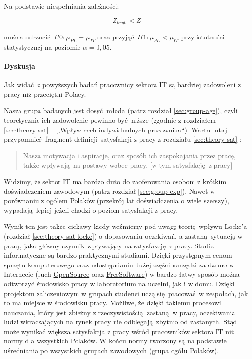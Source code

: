 Na podstawie niespełniania zależności:

\begin{equation}
  Z_{kryt.} < Z
\end{equation}

można odrzucić $H0: \mu_{PL} = \mu_{IT}$ oraz przyjąć $H1: \mu_{PL} < \mu_{IT}$ przy istotności statystycznej na poziomie $\alpha = 0,05$.

\paragraph{Dyskusja}
Jak widać z powyższych badań pracownicy sektora IT są bardziej zadowoleni z pracy niż przeciętni Polacy. 

Nasza grupa badanych jest dosyć młoda (patrz rozdział \ref{sec:group-age}), czyli teoretycznie ich zadowolenie powinno być niższe (zgodnie z rozdziałem \ref{sec:theory-sat} -- ,,Wpływ cech indywidualnych pracownika``). Warto tutaj przypomnieć fragment definicji satysfakcji z pracy z rozdziału \ref{sec:theory-sat} \cite{SchultzSat}:
\begin{quote}
  Nasza motywacja i aspiracje, oraz sposób ich zaspokajania przez pracę, także wpływają na postawy wobec pracy. [w tym satysfakcję z pracy]
\end{quote}
Widzimy, że sektor IT ma bardzo dużo do zaoferowania osobom z krótkim doświadczeniem zawodowym (patrz rozdział \ref{sec:group-exp}). Nawet w porównaniu z ogółem Polaków (przekrój lat doświadczenia o wiele szerszy), wypadają lepiej jeżeli chodzi o poziom satysfakcji z pracy.

Wynik ten jest także ciekawy kiedy weźmiemy pod uwagę teorię wpływu Locke'a (rozdział \ref{sec:theory-sat-locke}) o dopasowaniu oczekiwań, a zastaną sytuacją w pracy, jako główny czynnik wpływający na satysfakcję z pracy. Studia informatyczne są bardzo praktycznymi studiami. Dzięki przystępnym cenom sprzętu komputerowego oraz udostępnianiu dużej części narzędzi za darmo w Internecie (ruch
\href{http://en.wikipedia.org/wiki/Open-source_software}{OpenSource} oraz \href{http://en.wikipedia.org/wiki/Free_software}{FreeSoftware}) w bardzo łatwy sposób można odtworzyć środowisko pracy w laboratorium na uczelni, jak i w domu. Dzięki projektom zaliczeniowym w grupach studenci uczą się pracować w zespołach, jak to ma miejsce w środowisku pracy. Możliwe, że dzięki takiemu procesowi nauczania, który jest zbieżny z rzeczywistością zastaną w pracy, oczekiwania ludzi
wkraczających na rynek pracy nie odbiegają zbytnio od zastanych. Stąd może wynikać większa satysfakcja z pracy wśród pracowników sektora IT niż normy dla wszystkich Polaków. W końcu normy tworzony są na podstawie uśredniania po wszystkich grupach zawodowych (grupa ogółu Polaków).

